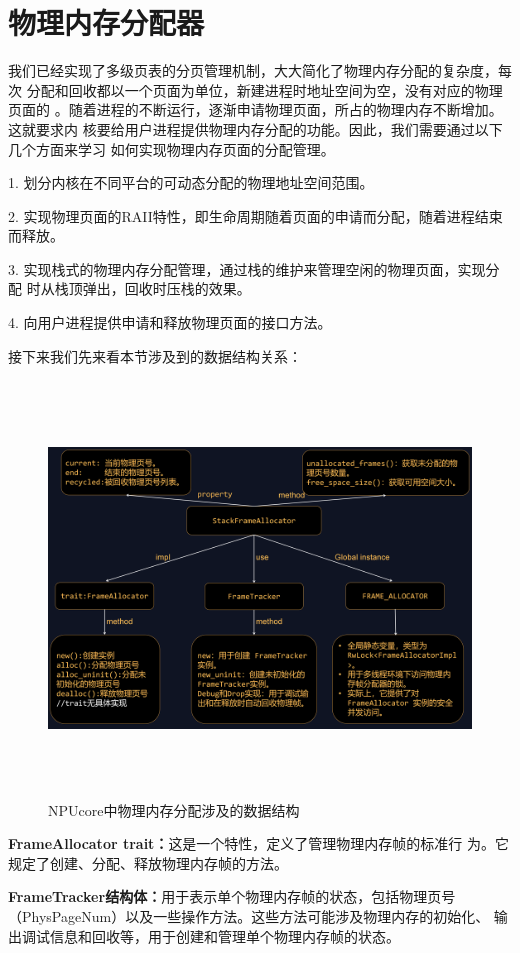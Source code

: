 	\section{物理内存分配器}
	我们已经实现了多级页表的分页管理机制，大大简化了物理内存分配的复杂度，每次
	分配和回收都以一个页面为单位，新建进程时地址空间为空，没有对应的物理页面的
	。随着进程的不断运行，逐渐申请物理页面，所占的物理内存不断增加。这就要求内
	核要给用户进程提供物理内存分配的功能。因此，我们需要通过以下几个方面来学习
	如何实现物理内存页面的分配管理。
	
	
	1. 划分内核在不同平台的可动态分配的物理地址空间范围。
	
	2. 实现物理页面的RAII特性，即生命周期随着页面的申请而分配，随着进程结束
	而释放。
	
	3. 实现栈式的物理内存分配管理，通过栈的维护来管理空闲的物理页面，实现分配
	时从栈顶弹出，回收时压栈的效果。
	
	4. 向用户进程提供申请和释放物理页面的接口方法。
	
	接下来我们先来看本节涉及到的数据结构关系：
	\begin{figure}[H]
		\centering
		\includegraphics[width=14cm,height=11cm]{figures/04-03-NPUcore中物理内存分配涉及的数据结构.png}
		\caption{NPUcore中物理内存分配涉及的数据结构}
	\end{figure}    
	\justifying  
	\textbf{FrameAllocator trait：}这是一个特性，定义了管理物理内存帧的标准行
	为。它规定了创建、分配、释放物理内存帧的方法。
	
	\textbf{FrameTracker结构体：}用于表示单个物理内存帧的状态，包括物理页号
	（PhysPageNum）以及一些操作方法。这些方法可能涉及物理内存的初始化、
	输出调试信息和回收等，用于创建和管理单个物理内存帧的状态。
	
